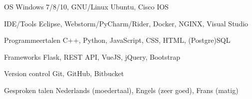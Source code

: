 
\begin{cvskills}

    \cvskill
        {OS} %
        {Windows 7/8/10, GNU/Linux Ubuntu, Cisco IOS} %
    
    \cvskill
        {IDE/Tools} %
        {Eclipse, Webstorm/PyCharm/Rider, Docker, NGINX, Visual Studio} %
    
    \cvskill
        {Programmeertalen} %
        {C++, Python, JavaScript, CSS, HTML, (Postgre)SQL} %

    \cvskill
        {Frameworks} %
        {Flask, REST API, VueJS, jQuery, Bootstrap} %
    
    \cvskill
        {Version control} %
        {Git, GitHub, Bitbucket} %
    
    \cvskill
        {Gesproken talen} %
        {Nederlands (moedertaal), Engels (zeer goed), Frans (matig)} %
    
\end{cvskills}
